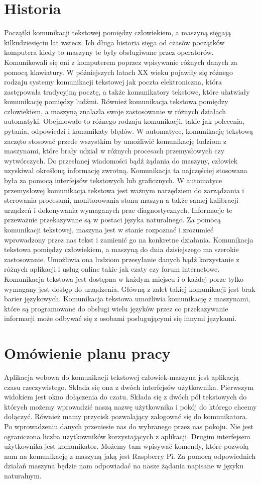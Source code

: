 \section{Historia}
Początki komunikacji tekstowej pomiędzy człowiekiem, a maszyną sięgają kilkudziesięciu lat wstecz. Ich długa historia sięga od czasów początków komputera kiedy to maszyny te były obsługiwane przez operatorów. Komunikowali się oni z komputerem poprzez wpisywanie różnych danych za pomocą klawiatury. W późniejszych latach XX wieku pojawiły się różnego rodzaju systemy komunikacji tekstowej jak poczta elektroniczna, która zastępowała tradycyjną pocztę, a także komunikatory tekstowe, które ułatwiały komunikację pomiędzy ludźmi. Również komunikacja tekstowa pomiędzy człowiekiem, a maszyną znalazła swoje zastosowanie w różnych działach automatyki. Obejmowało to różnego rodzaju komunikacji, takie jak polecenia, pytania, odpowiedzi i komunikaty błędów. W automatyce, komunikację tekstową zaczęto stosować przede wszystkim by umożliwić komunikację ludziom z maszynami, które brały udział w różnych procesach przemysłowych czy wytwórczych. Do przesłanej wiadomości bądź żądania do maszyny, człowiek uzyskiwał określoną informację zwrotną. Komunikacja ta najczęściej stosowana była za pomocą interfejsów tekstowych lub graficznych. W automatyce przemysłowej komunikacja tekstowa jest ważnym narzędziem do zarządzania i sterowania procesami, monitorowania stanu maszyn a także samej kalibracji urządzeń i dokonywania wymaganych prac diagnostycznych. Informacje te przeważnie przekazywane są w postaci języka naturalnego. Za pomocą komunikacji tekstowej, maszyna jest w stanie rozpoznać i zrozumieć wprowadzony przez nas tekst i zamienić go na konkretne działania. Komunikacja tekstowa pomiędzy człowiekiem, a maszyną do dnia dzisiejszego ma szerokie zastosowanie. Umożliwia ona ludziom przesyłanie danych bądź korzystanie z różnych aplikacji i usług online takie jak czaty czy forum internetowe. Komunikacja tekstowa jest dostępna w każdym miejscu i o każdej porze tylko wymagany jest dostęp do urządzenia. Główną z zalet takiej komunikacji jest brak barier językowych. Komunikacja tekstowa umożliwia komunikację z maszynami, które są programowane do obsługi wielu języków przez co przekazywanie informacji może odbywać się z osobami posługującymi się innymi językami.
\newpage
\section{Omówienie planu pracy}
Aplikacja webowa do komunikacji tekstowej człowiek-maszyna jest aplikacją czasu rzeczywistego. Składa się ona z dwóch interfejsów użytkownika. Pierwszym widokiem jest okno dołączenia do czatu. Składa się z dwóch pól tekstowych do których możemy wprowadzić naszą nazwę użytkownika i pokój do którego chcemy dołączyć. Również mamy przycisk pozwalający zalogować się do komunikatora. Po wprowadzeniu danych przeniesie nas do wybranego przez nas pokoju. Nie jest ograniczona liczba użytkowników korzystających z aplikacji. 
Drugim interfejsem użytkownika jest komunikator. Możemy tam wpisywać komendy, które pozwolą nam na komunikację z maszyną jaką jest Raspberry Pi. Za pomocą odpowiednich działań maszyna będzie nam odpowiadać na nasze żądania napisane w języku naturalnym. 

